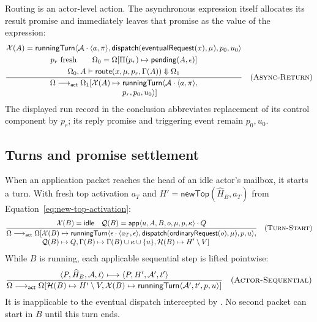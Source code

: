 Routing is an actor-level action.  The asynchronous expression itself
allocates its result promise and immediately leaves that promise as the value
of the expression:
{\small
\[
\dfrac{\begin{gathered}
 \mathcal X(A)=\mathsf{runningTurn}\langle\mathcal A\cdot\langle a,\pi\rangle,
   \mathsf{dispatch}(\mathsf{eventualRequest}(x),\mu),p_0,u_0\rangle\\
 p_r\text{ fresh}\qquad
 \Omega_0=\Omega[\Pi(p_r)\mapsto\mathsf{pending}(A,\epsilon)]\\
 \Omega_0,A\vdash\mathsf{route}(x,\mu,p_r,\Gamma(A))\Downarrow\Omega_1
\end{gathered}}
 {\begin{aligned}
  \Omega\longrightarrow_{\mathsf{act}}\Omega_1[\mathcal X(A)\mapsto{}&
   \mathsf{runningTurn}\langle\mathcal A\cdot\langle a,\pi\rangle,\\[-1mm]
   &p_r,p_0,u_0\rangle]
 \end{aligned}}
\quad(\textsc{Async-Return})
\]}
The displayed run record in the conclusion abbreviates replacement of its
control component by $p_r$; its reply promise and triggering event remain
$p_0,u_0$.

\subsection{Turns and promise settlement}

When an application packet reaches the head of an idle actor's mailbox, it
starts a turn.  With fresh top activation $a_T$ and
$H' =\mathsf{newTop}(\widehat H_B,a_T)$ from
Equation~\eqref{eq:new-top-activation}:
{\small
\[
\dfrac{\mathcal X(B)=\mathsf{idle}\quad
 \mathcal Q(B)=\mathsf{app}\langle u,A,B,o,\mu,p,\kappa\rangle\cdot Q}
 {\begin{aligned}
  \Omega\longrightarrow_{\mathsf{act}}\Omega[&\mathcal X(B)\mapsto
    \mathsf{runningTurn}\langle\epsilon\cdot\langle a_T,\epsilon\rangle,
       \mathsf{dispatch}(\mathsf{ordinaryRequest}(o),\mu),p,u\rangle,\\[-1mm]
   &\mathcal Q(B)\mapsto Q,
    \Gamma(B)\mapsto\Gamma(B)\cup\kappa\cup\{u\},
    \mathcal H(B)\mapsto H'\setminus V]
 \end{aligned}}
\quad(\textsc{Turn-Start})
\]}
While $B$ is running, each applicable sequential step is lifted pointwise:
\[
\dfrac{\langle P,\widehat H_B,\mathcal A,t\rangle
          \longmapsto\langle P,H',\mathcal A',t'\rangle}
 {\Omega\longrightarrow_{\mathsf{act}}
  \Omega[\mathcal H(B)\mapsto H'\setminus V,
         \mathcal X(B)\mapsto
          \mathsf{runningTurn}\langle\mathcal A',t',p,u\rangle]}
\quad(\textsc{Actor-Sequential})
\]
It is inapplicable to the eventual dispatch intercepted by
.  No second packet can start in $B$ until this turn
ends.

